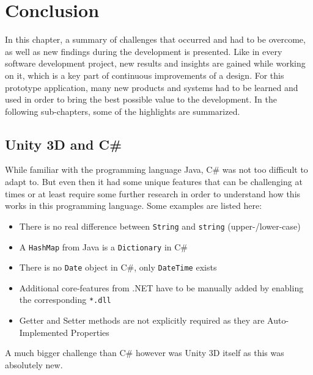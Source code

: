 
\section{Conclusion}

In this chapter, a summary of challenges that occurred and had to be overcome, as well as new findings during the development is presented. Like in every software development project, new results and insights are gained while working on it, which is a key part of continuous improvements of a design. For this prototype application, many new products and systems had to be learned and used in order to bring the best possible value to the development. In the following sub-chapters, some of the highlights are summarized.


\subsection{Unity 3D and C\#}

While familiar with the programming language Java, C\# was not too difficult to adapt to. But even then it had some unique features that can be challenging at times or at least require some further research in order to understand how this works in this programming language. Some examples are listed here:
\begin{itemize}[noitemsep,nolistsep]
	\item There is no real difference between \texttt{String} and \texttt{string} (upper-/lower-case)
	\item A \texttt{HashMap} from Java is a \texttt{Dictionary} in C\#
	\item There is no \texttt{Date} object in C\#, only \texttt{DateTime} exists
	\item Additional core-features from .NET have to be manually added by enabling the corresponding \texttt{*.dll}
	\item Getter and Setter methods are not explicitly required as they are Auto-Implemented Properties
\end{itemize}
A much bigger challenge than C\# however was Unity 3D itself as this was absolutely new.


